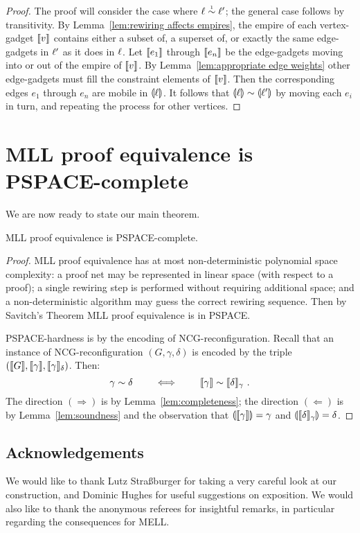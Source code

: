 \documentclass{lmcs}
\let\capsabbrev=\uppercase
\begin{document}
\begin{proof}
The proof will consider the case where $\links\perm*\links'$; the general case follows by transitivity.
%
By Lemma~\ref{lem:rewiring affects empires}, the empire of each vertex-gadget $\llbracket v\rrbracket$ contains either a subset of, a superset of, or exactly the same edge-gadgets in $\ell'$ as it does in $\ell$.
%
Let $\llbracket e_1\rrbracket$ through $\llbracket e_n\rrbracket$ be the edge-gadgets moving into or out of the empire of $\llbracket v\rrbracket$.
%
By Lemma~\ref{lem:appropriate edge weights} other edge-gadgets must fill the constraint elements of $\llbracket v\rrbracket$.
%
Then the corresponding edges $e_1$ through $e_n$ are mobile in $\llparenthesis\ell\rrparenthesis$.
%
It follows that $\coitn\links\perm\coitn{\links'}$ by moving each $e_i$ in turn, and repeating the process for other vertices.
%
\end{proof}





\section{\capsabbrev{mll} proof equivalence is \capsabbrev{pspace}-complete}


%
We are now ready to state our main theorem.


\begin{theorem}
\capsabbrev{mll} proof equivalence is \capsabbrev{pspace}-complete.
\end{theorem}

\begin{proof}
\capsabbrev{mll} proof equivalence has at most non-deterministic polynomial space complexity: a proof net may be represented in linear space (with respect to a proof); a single rewiring step is performed without requiring additional space; and a non-deterministic algorithm may guess the correct rewiring sequence.
%
Then by Savitch's Theorem \cite{Savitch-1970} \capsabbrev{mll} proof equivalence is in \capsabbrev{pspace}.


\capsabbrev{pspace}-hardness is by the encoding of \capsabbrev{ncg}-reconfiguration. Recall that an instance of \capsabbrev{ncg}-reconfiguration $(G,\gamma,\delta)$ is encoded by the triple $(\llbracket G\rrbracket,\llbracket\gamma\rrbracket,\llbracket\gamma\rrbracket_\delta)$. Then:
\[
	\gamma\perm\delta \qquad\iff\qquad \itn\gamma\perm\itn\delta_\gamma~.
\]
%
The direction $(\Rightarrow)$ is by Lemma~\ref{lem:completeness}; the direction $(\Leftarrow)$ is by Lemma~\ref{lem:soundness} and the observation that $\llparenthesis\llbracket\gamma\rrbracket\rrparenthesis=\gamma$ and $\llparenthesis\llbracket\delta\rrbracket_\gamma\rrparenthesis=\delta$.
\end{proof}



\subsection*{Acknowledgements}
We would like to thank Lutz Stra{\ss}burger for taking a very careful look at our construction, and Dominic Hughes for useful suggestions on exposition. We would also like to thank the anonymous referees for insightful remarks, in particular regarding the consequences for MELL.



\end{document}

